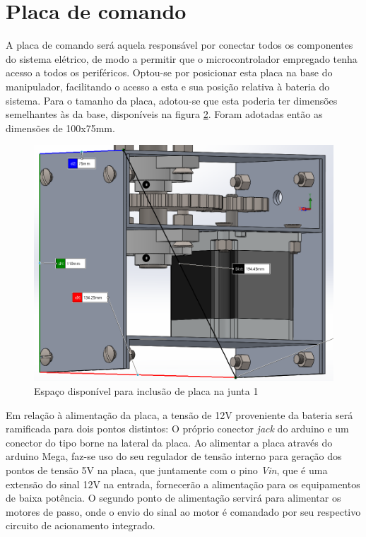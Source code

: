 \begin{figure}[ht]
\begin{centering}
\begin{floatrow}
    \end{floatrow}

    \par\end{centering}

    \label{fig:Placa-sensoriamento}
\end{figure}

\section{Placa de comando}

A placa de comando será aquela responsável por conectar todos os 
componentes do sistema elétrico, de modo a permitir que o 
microcontrolador empregado tenha acesso a todos os periféricos.
Optou-se por posicionar esta placa na base do manipulador, facilitando 
o acesso a esta e sua posição relativa à bateria do sistema.
Para o tamanho da placa, adotou-se que esta poderia ter dimensões semelhantes
às da base, disponíveis na figura \ref{fig:TamanhoPCB-Junta1}.
Foram adotadas então as dimensões de 100x75mm.

\begin{figure}[h]
    \caption{Espaço disponível para inclusão de placa na junta 1}    
    \begin{centering}

        \includegraphics[width=0.7\columnwidth]{images/pcbs/MainPCB-Dimensoes.png}
    
    \par\end{centering}

    \label{fig:TamanhoPCB-Junta1}
\end{figure}

Em relação à alimentação da placa, a tensão de 12V proveniente da bateria será
ramificada para dois pontos distintos: O próprio conector \textit{jack}
do arduino e um conector do tipo borne na lateral da placa.
Ao alimentar a placa através do arduino Mega, faz-se uso do seu 
regulador de tensão interno para geração dos pontos de tensão 5V na 
placa, que juntamente com o pino \textit{Vin}, que é uma extensão do 
sinal 12V na entrada, fornecerão a alimentação para os equipamentos de 
baixa potência. 
O segundo ponto de alimentação servirá para alimentar os motores de 
passo, onde o envio do sinal ao motor é comandado por seu respectivo 
circuito de acionamento integrado.

